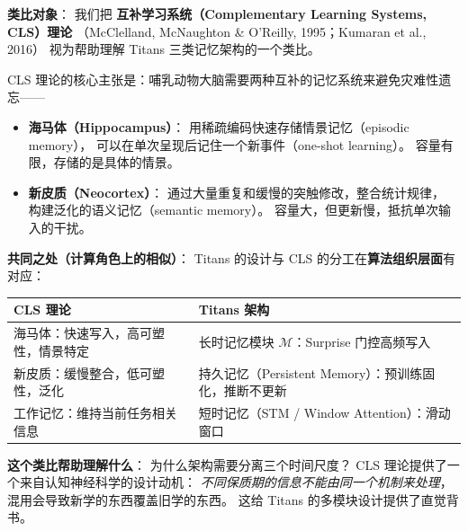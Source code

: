 \begin{neurosciencebox}[title=神经科学直觉：互补学习系统（CLS）理论]

\textbf{类比对象}：
我们把 \textbf{互补学习系统（Complementary Learning Systems, CLS）理论}
（McClelland, McNaughton \& O'Reilly, 1995；Kumaran et al., 2016）
视为帮助理解 Titans 三类记忆架构的一个类比。

CLS 理论的核心主张是：哺乳动物大脑需要两种互补的记忆系统来避免灾难性遗忘——
\begin{itemize}
  \item \textbf{海马体（Hippocampus）}：
    用稀疏编码快速存储情景记忆（episodic memory），
    可以在单次呈现后记住一个新事件（one-shot learning）。
    容量有限，存储的是具体的情景。
  \item \textbf{新皮质（Neocortex）}：
    通过大量重复和缓慢的突触修改，整合统计规律，
    构建泛化的语义记忆（semantic memory）。
    容量大，但更新慢，抵抗单次输入的干扰。
\end{itemize}

\textbf{共同之处（计算角色上的相似）}：
Titans 的设计与 CLS 的分工在\textbf{算法组织层面}有对应：
\begin{center}
\begin{tabular}{p{4cm} p{4cm}}
\toprule
\textbf{CLS 理论} & \textbf{Titans 架构} \\
\midrule
海马体：快速写入，高可塑性，情景特定 & 长时记忆模块 $\mathcal{M}$：Surprise 门控高频写入 \\
新皮质：缓慢整合，低可塑性，泛化 & 持久记忆（Persistent Memory）：预训练固化，推断不更新 \\
工作记忆：维持当前任务相关信息 & 短时记忆（STM / Window Attention）：滑动窗口 \\
\bottomrule
\end{tabular}
\end{center}

\textbf{这个类比帮助理解什么}：
为什么架构需要分离三个时间尺度？
CLS 理论提供了一个来自认知神经科学的设计动机：
\textit{不同保质期的信息不能由同一个机制来处理}，
混用会导致新学的东西覆盖旧学的东西。
这给 Titans 的多模块设计提供了直觉背书。

\end{neurosciencebox}

